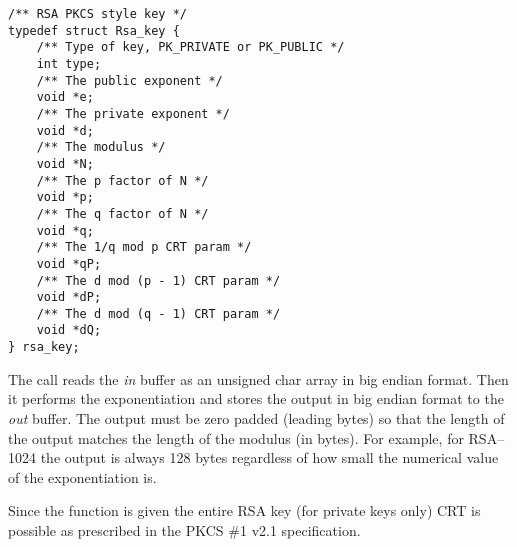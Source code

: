 \documentclass[synpaper]{book}
\begin{document}
\begin{verbatim}
/** RSA PKCS style key */
typedef struct Rsa_key {
    /** Type of key, PK_PRIVATE or PK_PUBLIC */
    int type;
    /** The public exponent */
    void *e; 
    /** The private exponent */
    void *d; 
    /** The modulus */
    void *N; 
    /** The p factor of N */
    void *p; 
    /** The q factor of N */
    void *q; 
    /** The 1/q mod p CRT param */
    void *qP; 
    /** The d mod (p - 1) CRT param */
    void *dP; 
    /** The d mod (q - 1) CRT param */
    void *dQ;
} rsa_key;
\end{verbatim}

The call reads the \textit{in} buffer as an unsigned char array in big endian format.  Then it performs the exponentiation and stores the output in big endian format
to the \textit{out} buffer.  The output must be zero padded (leading bytes) so that the length of the output matches the length of the modulus (in bytes).  For example,
for RSA--1024 the output is always 128 bytes regardless of how small the numerical value of the exponentiation is.

Since the function is given the entire RSA key (for private keys only) CRT is possible as prescribed in the PKCS \#1 v2.1 specification.

\newpage
{}

\end{document}
